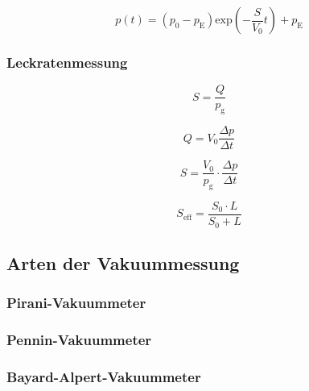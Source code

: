 			\begin{equation}
				p(t) = (p_0 - p_\text{E}) \text{exp}\left( - \frac{S}{V_0}t \right) + p_\text{E}
			\end{equation}

		\subsubsection{Leckratenmessung}

			\begin{equation}
				S = \frac{Q}{p_\text{g}}
			\end{equation}

			\begin{equation}
				Q = V_0 \frac{\Delta p}{\Delta t}
			\end{equation}

			\begin{equation}
				S = \frac{V_0}{p_\text{g}} \cdot \frac{\Delta p}{\Delta t}
			\end{equation}

			\begin{equation}
				S_\text{eff} = \frac{S_0 \cdot L}{S_0 + L}
			\end{equation}

	\subsection{Arten der Vakuummessung}
		
		\subsubsection{Pirani-Vakuummeter}

		\subsubsection{Pennin-Vakuummeter}

		\subsubsection{Bayard-Alpert-Vakuummeter}
			

